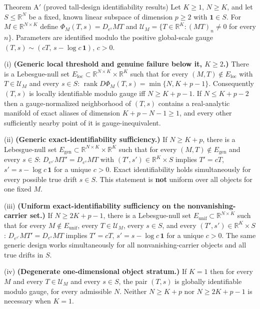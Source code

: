 \begin{namedthm}{Theorem A$'$ (proved tall-design identifiability results)}
Let $K\ge1$, $N\ge K$, and let $S\le\mathbb R^N$ be a fixed, known linear subspace of dimension $p\ge2$ with $\mathbf 1\in S$. For $M\in\mathbb R^{N\times K}$ define $\Phi_M(T,s)=D_{e^{s}}MT$ and $\mathcal U_M=\{T\in\mathbb R^K:(MT)_n\neq0$ for every $n\}$. Parameters are identified modulo the positive global-scale gauge $(T,s)\sim(cT,\,s-\log c\,\mathbf 1)$, $c>0$.

(i) \textbf{(Generic local threshold and genuine failure below it, $K\ge2$.)} There is a Lebesgue-null set $E_{\mathrm{loc}}\subset\mathbb R^{N\times K}\times\mathbb R^K$ such that for every $(M,T)\notin E_{\mathrm{loc}}$ with $T\in\mathcal U_M$ and every $s\in S$: $\operatorname{rank}D\Phi_M(T,s)=\min\{N,K+p-1\}$. Consequently $(T,s)$ is locally identifiable modulo gauge iff $N\ge K+p-1$. If $N\le K+p-2$ then a gauge-normalized neighborhood of $(T,s)$ contains a real-analytic manifold of exact aliases of dimension $K+p-N-1\ge1$, and every other sufficiently nearby point of it is gauge-inequivalent.

(ii) \textbf{(Generic exact-identifiability sufficiency.)} If $N\ge K+p$, there is a Lebesgue-null set $E_{\mathrm{gen}}\subset\mathbb R^{N\times K}\times\mathbb R^K$ such that for every $(M,T)\notin E_{\mathrm{gen}}$ and every $s\in S$: $D_{e^{s'}}MT'=D_{e^{s}}MT$ with $(T',s')\in\mathbb R^K\times S$ implies $T'=cT$, $s'=s-\log c\,\mathbf 1$ for a unique $c>0$. Exact identifiability holds simultaneously for every possible true drift $s\in S$. This statement is \textbf{not} uniform over all objects for one fixed $M$.

(iii) \textbf{(Uniform exact-identifiability sufficiency on the nonvanishing-carrier set.)} If $N\ge2K+p-1$, there is a Lebesgue-null set $E_{\mathrm{unif}}\subset\mathbb R^{N\times K}$ such that for every $M\notin E_{\mathrm{unif}}$, every $T\in\mathcal U_M$, every $s\in S$, and every $(T',s')\in\mathbb R^K\times S$: $D_{e^{s'}}MT'=D_{e^{s}}MT$ implies $T'=cT$, $s'=s-\log c\,\mathbf 1$ for a unique $c>0$. The same generic design works simultaneously for all nonvanishing-carrier objects and all true drifts in $S$.

(iv) \textbf{(Degenerate one-dimensional object stratum.)} If $K=1$ then for every $M$ and every $T\in\mathcal U_M$ and every $s\in S$, the pair $(T,s)$ is globally identifiable modulo gauge, for every admissible $N$. Neither $N\ge K+p$ nor $N\ge2K+p-1$ is necessary when $K=1$.
\end{namedthm}

